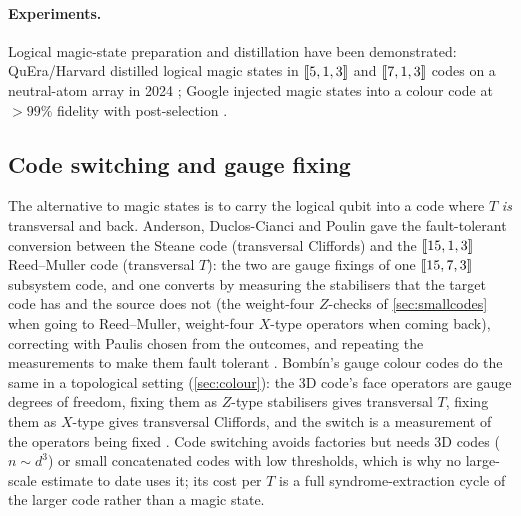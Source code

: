\paragraph{Experiments.} Logical magic-state preparation and distillation have been demonstrated: QuEra/Harvard distilled logical magic states in $[\![5,1,3]\!]$ and $[\![7,1,3]\!]$ codes on a neutral-atom array in 2024 \cite{rodriguez24distill}; Google injected magic states into a colour code at $>99\%$ fidelity with post-selection \cite{lacroix24color}.

\subsection{Code switching and gauge fixing}\label{sec:codeswitch}
The alternative to magic states is to carry the logical qubit into a code where $T$ \emph{is} transversal and back. Anderson, Duclos-Cianci and Poulin \cite{anderson14} gave the fault-tolerant conversion between the Steane code (transversal Cliffords) and the $[\![15,1,3]\!]$ Reed--Muller code (transversal $T$): the two are gauge fixings of one $[\![15,7,3]\!]$ subsystem code, and one converts by measuring the stabilisers that the target code has and the source does not (the weight-four $Z$-checks of \cref{sec:smallcodes} when going to Reed--Muller, weight-four $X$-type operators when coming back), correcting with Paulis chosen from the outcomes, and repeating the measurements to make them fault tolerant \cite{paetznick-reichardt13}. Bomb\'in's gauge colour codes do the same in a topological setting (\cref{sec:colour}): the 3D code's face operators are gauge degrees of freedom, fixing them as $Z$-type stabilisers gives transversal $T$, fixing them as $X$-type gives transversal Cliffords, and the switch is a measurement of the operators being fixed \cite{bombin15}. Code switching avoids factories but needs 3D codes ($n\sim d^3$) or small concatenated codes with low thresholds, which is why no large-scale estimate to date uses it; its cost per $T$ is a full syndrome-extraction cycle of the larger code rather than a magic state.

